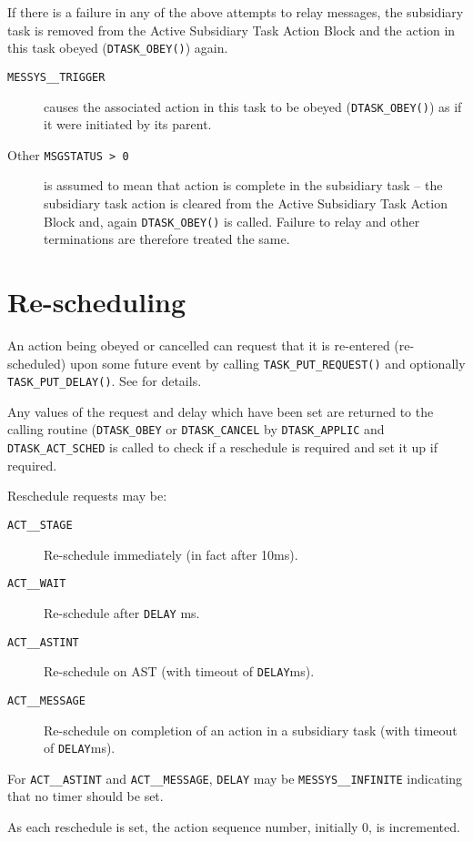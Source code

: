 \documentclass[twoside,11pt,nolof]{starlink}
\begin{document}
If there is a failure in any of the above attempts to relay messages, the
subsidiary task is removed from the Active Subsidiary Task Action Block
and the action in this task obeyed (\texttt{DTASK\_OBEY()}) again.
\begin{description}
\item[\texttt{MESSYS\_\_TRIGGER}] causes the associated action in this task to
be obeyed (\texttt{DTASK\_OBEY()}) as if it were initiated by its parent.
\item[Other \texttt{MSGSTATUS > 0}] is assumed to mean that action is complete
in the subsidiary task -- the subsidiary task action is cleared from the
Active Subsidiary Task Action Block and, again \texttt{DTASK\_OBEY()} is
called.
Failure to relay and other terminations are therefore treated the same.
\end{description}

\section{\label{rescheduling}Re-scheduling}
An action being obeyed or cancelled can request that it is re-entered
(re-scheduled) upon some future event by calling \texttt{TASK\_PUT\_REQUEST()}
and optionally \texttt{TASK\_PUT\_DELAY()}. See
for details.

Any values of the request and delay which have been set are returned to the
calling routine (\texttt{DTASK\_OBEY} or \texttt{DTASK\_CANCEL} by
\texttt{DTASK\_APPLIC} and \texttt{DTASK\_ACT\_SCHED} is called to check if
a reschedule is required and set it up if required.

Reschedule requests may be:
\begin{description}
\item[\texttt{ACT\_\_STAGE}] Re-schedule immediately (in fact after 10ms).
\item[\texttt{ACT\_\_WAIT}] Re-schedule after \texttt{DELAY} ms.
\item[\texttt{ACT\_\_ASTINT}] Re-schedule on AST (with timeout of
\texttt{DELAY}ms).
\item[\texttt{ACT\_\_MESSAGE}] Re-schedule on completion of an action in a
subsidiary task (with timeout of \texttt{DELAY}ms).
\end{description}
For \texttt{ACT\_\_ASTINT} and \texttt{ACT\_\_MESSAGE}, \texttt{DELAY} may be
\texttt{MESSYS\_\_INFINITE} indicating that no timer should be set.

As each reschedule is set, the action sequence number, initially 0, is
incremented.
\end{document}
